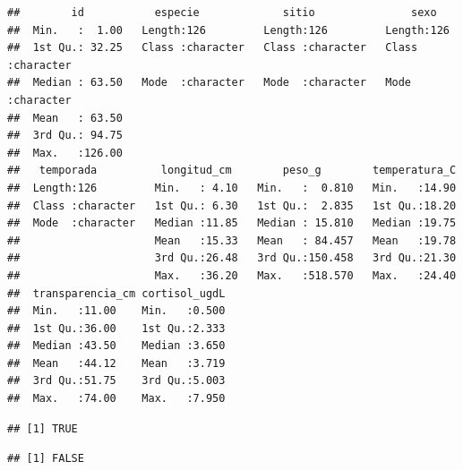 \documentclass[
]{article}
\newenvironment{Shaded}{\begin{snugshade}}{\end{snugshade}}
\newcommand{\CommentTok}[1]{\textcolor[rgb]{0.56,0.35,0.01}{\textit{#1}}}
\newcommand{\FunctionTok}[1]{\textcolor[rgb]{0.13,0.29,0.53}{\textbf{#1}}}
\newcommand{\NormalTok}[1]{#1}
\newcommand{\SpecialCharTok}[1]{\textcolor[rgb]{0.81,0.36,0.00}{\textbf{#1}}}
\begin{document}
\begin{verbatim}
##        id           especie             sitio               sexo          
##  Min.   :  1.00   Length:126         Length:126         Length:126        
##  1st Qu.: 32.25   Class :character   Class :character   Class :character  
##  Median : 63.50   Mode  :character   Mode  :character   Mode  :character  
##  Mean   : 63.50                                                           
##  3rd Qu.: 94.75                                                           
##  Max.   :126.00                                                           
##   temporada          longitud_cm        peso_g        temperatura_C  
##  Length:126         Min.   : 4.10   Min.   :  0.810   Min.   :14.90  
##  Class :character   1st Qu.: 6.30   1st Qu.:  2.835   1st Qu.:18.20  
##  Mode  :character   Median :11.85   Median : 15.810   Median :19.75  
##                     Mean   :15.33   Mean   : 84.457   Mean   :19.78  
##                     3rd Qu.:26.48   3rd Qu.:150.458   3rd Qu.:21.30  
##                     Max.   :36.20   Max.   :518.570   Max.   :24.40  
##  transparencia_cm cortisol_ugdL  
##  Min.   :11.00    Min.   :0.500  
##  1st Qu.:36.00    1st Qu.:2.333  
##  Median :43.50    Median :3.650  
##  Mean   :44.12    Mean   :3.719  
##  3rd Qu.:51.75    3rd Qu.:5.003  
##  Max.   :74.00    Max.   :7.950
\end{verbatim}

\begin{Shaded}
\end{Shaded}

\begin{verbatim}
## [1] TRUE
\end{verbatim}

\begin{Shaded}
\end{Shaded}

\begin{verbatim}
## [1] FALSE
\end{verbatim}

\begin{Shaded}
\end{Shaded}
\end{document}
